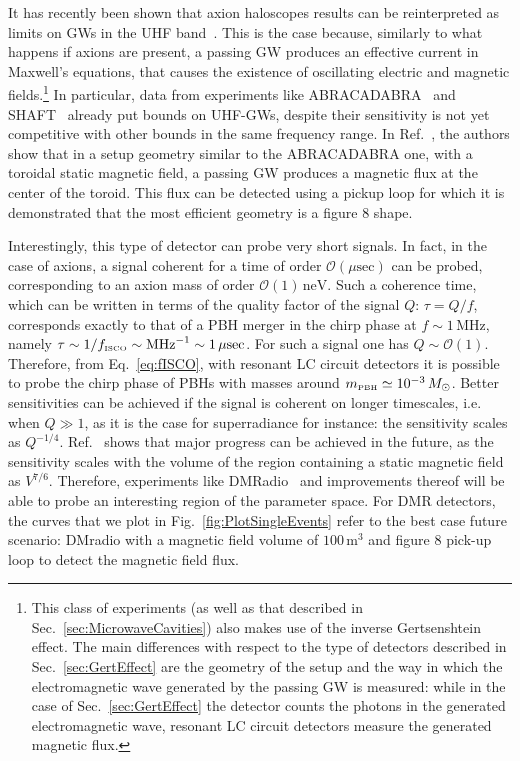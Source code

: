 \documentclass[11pt,a4paper]{article}
\begin{document}
It has recently been shown that axion haloscopes results can be reinterpreted as limits on GWs in the UHF band~\cite{Domcke:2022rgu}. This is the case because, similarly to what happens if axions are present, a passing GW produces an effective current in Maxwell's equations, that causes the existence of oscillating electric and magnetic fields.\footnote{This class of experiments (as well as that described in Sec.~\ref{sec:MicrowaveCavities}) also makes use of the inverse Gertsenshtein effect. The main differences with respect to the type of detectors described in Sec.~\ref{sec:GertEffect} are the geometry of the setup and the way in which the electromagnetic wave generated by the passing GW is measured: while in the case of Sec.~\ref{sec:GertEffect} the detector counts the photons in the generated electromagnetic wave, resonant LC circuit detectors measure the generated magnetic flux.} In particular, data from experiments like ABRACADABRA~\cite{Kahn:2016aff, Ouellet:2018beu, Ouellet:2019tlz, Salemi:2021gck} and SHAFT~\cite{Gramolin:2020ict} already put bounds on UHF-GWs, despite their sensitivity is not yet competitive with other bounds in the same frequency range. In Ref.~\cite{Domcke:2022rgu}, the authors show that in a setup geometry similar to the ABRACADABRA one, with a toroidal static magnetic field, a passing GW produces a magnetic flux at the center of the toroid. This flux can be detected using a pickup loop for which it is demonstrated that the most efficient geometry is a figure $8$ shape.

Interestingly, this type of detector can probe very short signals. In fact, in the case of axions, a signal coherent for a time of order $\mathcal{O}(\mu\text{sec})$ can be probed, corresponding to an axion mass of order $\mathcal{O}(1) \, \text{neV}$. Such a coherence time, which can be written in terms of the quality factor of the signal $Q$: $\tau = Q/f$, corresponds exactly to that of a PBH merger in the chirp phase at $f \sim 1 \, \text{MHz}$, namely $\tau \sim 1/f_\text{\tiny ISCO} \sim \text{MHz}^{-1} \sim 1 \, \mu\text{sec}$. For such a signal one has $Q \sim \mathcal{O}(1)$. Therefore, from Eq.~\eqref{eq:fISCO}, with resonant LC circuit detectors it is possible to probe the chirp phase of PBHs with masses around $m_\text{\tiny PBH} \simeq 10^{-3} \, M_\odot$. Better sensitivities can be achieved if the signal is coherent on longer timescales, i.e. when $Q \gg 1$, as it is the case for superradiance for instance: the sensitivity scales as $Q^{-1/4}$. Ref.~\cite{Domcke:2022rgu} shows that major progress can be achieved in the future, as the sensitivity scales with the volume of the region containing a static magnetic field as $V^{7/6}$. Therefore, experiments like DMRadio~\cite{Chaudhuri:2014dla, Silva-Feaver:2016qhh} and improvements thereof will be able to probe an interesting region of the parameter space. 
For DMR detectors, the curves that we plot in Fig.~\ref{fig:PlotSingleEvents} refer to the best case future scenario: DMradio with a magnetic field volume of $100 \, \text{m}^3$ and figure 8 pick-up loop to detect the magnetic field flux. 
\end{document}
